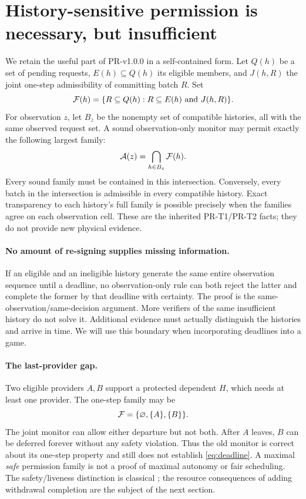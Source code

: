 \documentclass[11pt,a4paper]{article}
\theoremstyle{definition}\newtheorem{definition}{Definition}
\begin{document}
\section{History-sensitive permission is necessary, but insufficient}
\label{sec:envelope}
We retain the useful part of PR-v1.0.0 in a self-contained form. Let $Q(h)$ be a set of pending requests, $E(h)\subseteq Q(h)$ its eligible members, and $J(h,R)$ the joint one-step admissibility of committing batch $R$. Set
\begin{equation}
\mathcal F(h)=\{R\subseteq Q(h):R\subseteq E(h)\text{ and }J(h,R)\}.
\end{equation}
For observation $z$, let $B_z$ be the nonempty set of compatible histories, all with the same observed request set. A sound observation-only monitor may permit exactly the following largest family:
\begin{equation}
\label{eq:envelope}
\mathcal A(z)=\bigcap_{h\in B_z}\mathcal F(h).
\end{equation}
Every sound family must be contained in this intersection. Conversely, every batch in the intersection is admissible in every compatible history. Exact transparency to each history's full family is possible precisely when the families agree on each observation cell. These are the inherited PR-T1/PR-T2 facts; they do not provide new physical evidence.

\paragraph{No amount of re-signing supplies missing information.}
If an eligible and an ineligible history generate the same entire observation sequence until a deadline, no observation-only rule can both reject the latter and complete the former by that deadline with certainty. The proof is the same-observation/same-decision argument. More verifiers of the same insufficient history do not solve it. Additional evidence must actually distinguish the histories and arrive in time. We will use this boundary when incorporating deadlines into a game.

\paragraph{The last-provider gap.}
Two eligible providers $A,B$ support a protected dependent $H$, which needs at least one provider. The one-step family may be
\begin{equation}
\label{eq:last}
\mathcal F=\{\varnothing,\{A\},\{B\}\}.
\end{equation}
The joint monitor can allow either departure but not both. After $A$ leaves, $B$ can be deferred forever without any safety violation. Thus the old monitor is correct about its one-step property and still does not establish \cref{eq:deadline}. A maximal \emph{safe} permission family is not a proof of maximal autonomy or fair scheduling. The safety/liveness distinction is classical \cite{alpern}; the resource consequences of adding withdrawal completion are the subject of the next section.
\end{document}
